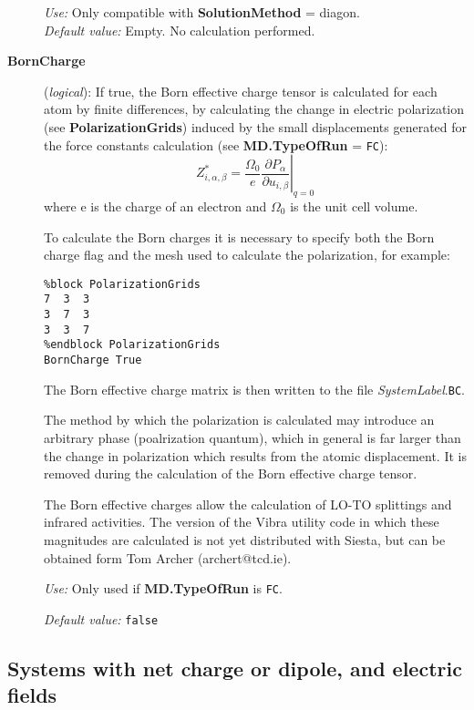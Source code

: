\documentclass[11pt]{article}
\begin{document}
\begin{description}
{\it Use:} Only compatible with {\bf SolutionMethod} = diagon.\\
{\it Default value:} Empty. No calculation performed.

\item[{\bf BornCharge}] ({\it logical}):
If true, the Born effective charge tensor is calculated for each atom
by finite differences, by calculating the change in electric polarization 
(see {\bf PolarizationGrids}) induced by the small displacements generated 
for the force constants calculation (see {\bf MD.TypeOfRun} = {\tt FC}):
\begin{equation}\label {eq:effective_charge}
Z^*_{i,\alpha,\beta}=\frac{\Omega_0}{e} \left. {\frac{\partial{P_\alpha}}
{\partial{u_{i,\beta}}}}\right|_{q=0}
\end{equation}
where e is the charge of an electron and $\Omega_0$ is the unit cell volume.

To calculate the Born charges it is necessary to specify both the Born 
charge flag and the mesh used to calculate the polarization, for example:
\begin{verbatim}
%block PolarizationGrids
7  3  3
3  7  3
3  3  7
%endblock PolarizationGrids
BornCharge True
\end{verbatim}

The Born effective charge matrix is then written to the file 
{\it SystemLabel}.{\tt BC}.

The method by which the polarization is calculated may introduce an arbitrary 
phase (poalrization quantum), which in general is far larger than the change 
in polarization which results from the atomic displacement. It is removed 
during the calculation of the Born effective charge tensor. 

The Born effective charges allow the calculation of LO-TO splittings and 
infrared activities. The version of the Vibra utility code in which these
magnitudes are calculated is not yet distributed with {\sc Siesta}, but can be 
obtained form Tom Archer (archert@tcd.ie).

{\it Use:} Only used if {\bf MD.TypeOfRun} is {\tt FC}.

{\it Default value:} {\tt false}

\end{description}

\vspace{5pt}
\subsection{Systems with net charge or dipole, and electric fields}
\end{document}
